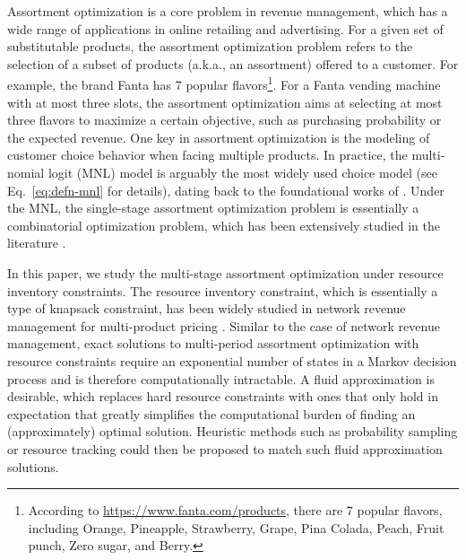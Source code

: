 \documentclass[opre]{informs3aa}
\begin{document}
Assortment optimization is a core problem in revenue management, which has a wide range of applications in online retailing and advertising. For a given set of substitutable products, the assortment optimization problem refers to the selection of a subset of products (a.k.a., an assortment) offered to a customer. For example, the brand Fanta has 7 popular flavors\footnote{According to \url{https://www.fanta.com/products}, there are 7 popular flavors, including Orange, Pineapple, Strawberry, Grape, Pina Colada, Peach, Fruit punch, Zero sugar, and Berry.}. For a Fanta vending machine with at most three slots, the assortment optimization aims at selecting at most three flavors to maximize a certain objective, such as purchasing probability or the expected revenue.  One key in assortment optimization is the modeling of customer choice behavior when facing multiple products. {In practice, the multi-nomial logit (MNL) model is arguably the most widely used choice model (see Eq.~\eqref{eq:defn-mnl} for details),
dating back to the foundational works of \cite{mcfadden1972conditional,McFadden1980,mcfadden2000mixed}.}
Under the MNL, the single-stage assortment optimization problem is essentially a combinatorial optimization problem, which has been extensively studied in the literature \citep{Ryzin1999,Mahajan2001,Talluri2004,Gallego2004,Liu2008,rusmevichientong2010dynamic}. 

In this paper, we study the {multi-stage} assortment optimization under resource inventory constraints. The resource inventory constraint, which is essentially a type of knapsack constraint, has been widely studied in network revenue management for multi-product pricing  \citep{Gallego1997}. Similar to the case of network revenue management, exact solutions to multi-period assortment optimization with resource constraints require an exponential number of states in a Markov decision process and is therefore computationally intractable.
A fluid approximation is desirable, which replaces hard resource constraints with ones that only hold in expectation that greatly simplifies the computational burden
of finding an (approximately) optimal solution.
Heuristic methods such as probability sampling or resource tracking could then be proposed to match such fluid approximation solutions.

\end{document}
